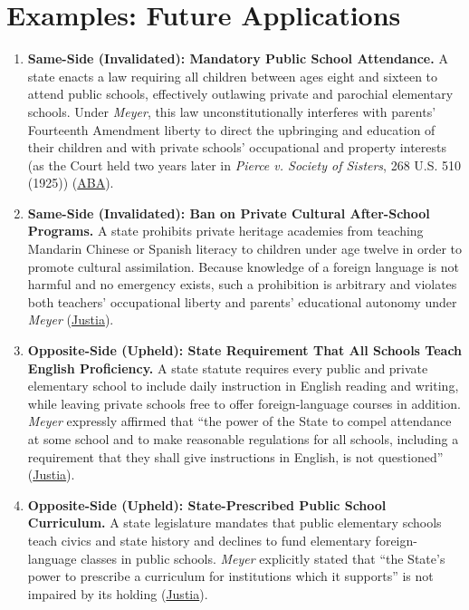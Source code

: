 \documentclass[12pt]{article}
\begin{document}
\section{Examples: Future Applications}

\begin{enumerate}
\item \textbf{Same-Side (Invalidated): Mandatory Public School Attendance.} A state enacts a law requiring all children between ages eight and sixteen to attend public schools, effectively outlawing private and parochial elementary schools. Under \textit{Meyer}, this law unconstitutionally interferes with parents' Fourteenth Amendment liberty to direct the upbringing and education of their children and with private schools' occupational and property interests (as the Court held two years later in \textit{Pierce v. Society of Sisters}, 268 U.S. 510 (1925)) (\href{https://www.americanbar.org/groups/public_interest/child_law/resources/child_law_practiceonline/child_law_practice/vol-35/february-2016/parental-rights-cases-to-know/}{ABA}).
\item \textbf{Same-Side (Invalidated): Ban on Private Cultural After-School Programs.} A state prohibits private heritage academies from teaching Mandarin Chinese or Spanish literacy to children under age twelve in order to promote cultural assimilation. Because knowledge of a foreign language is not harmful and no emergency exists, such a prohibition is arbitrary and violates both teachers' occupational liberty and parents' educational autonomy under \textit{Meyer} (\href{https://supreme.justia.com/cases/federal/us/262/390/}{Justia}).
\item \textbf{Opposite-Side (Upheld): State Requirement That All Schools Teach English Proficiency.} A state statute requires every public and private elementary school to include daily instruction in English reading and writing, while leaving private schools free to offer foreign-language courses in addition. \textit{Meyer} expressly affirmed that ``the power of the State to compel attendance at some school and to make reasonable regulations for all schools, including a requirement that they shall give instructions in English, is not questioned'' (\href{https://supreme.justia.com/cases/federal/us/262/390/}{Justia}).
\item \textbf{Opposite-Side (Upheld): State-Prescribed Public School Curriculum.} A state legislature mandates that public elementary schools teach civics and state history and declines to fund elementary foreign-language classes in public schools. \textit{Meyer} explicitly stated that ``the State's power to prescribe a curriculum for institutions which it supports'' is not impaired by its holding (\href{https://supreme.justia.com/cases/federal/us/262/390/}{Justia}).

\end{enumerate}
\end{document}
